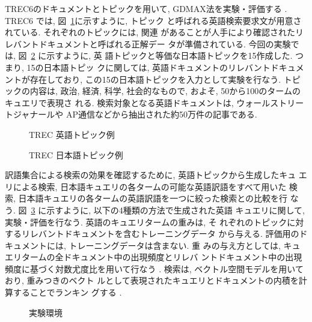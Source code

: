 TREC6のドキュメントとトピックを用いて, GDMAX法を実験・評価する
\cite{trec,trec4}. TREC6 では, 図~\ref{topic1e}に示すように, トピック
と呼ばれる英語検索要求文が用意されている. それぞれのトピックには, 関連
があることが人手により確認されたリレバントドキュメントと呼ばれる正解デー
タが準備されている. 今回の実験では, 図~\ref{topic1j} に示すように, 英
語トピックと等価な日本語トピックを15作成した. つまり, 15の日本語トピッ
クに関しては, 英語ドキュメントのリレバントドキュメントが存在しており, 
この15の日本語トピックを入力として実験を行なう. トピックの内容は, 政治, 
経済, 科学, 社会的なもので, およそ, 50から100のタームのキュエリで表現さ
れる. 検索対象となる英語ドキュメントは, ウォールストリートジャナールや
AP通信などから抽出された約50万件の記事である. 

\begin{figure}[tb]
\vspace*{-4mm}
      \begin{center}
      \end{center}
  \caption{TREC 英語トピック例}
  \label{topic1e}
\end{figure} 

\begin{figure}[tb]
      \begin{center}
      \end{center}
  \caption{TREC 日本語トピック例}
  \label{topic1j}
\end{figure} 

訳語集合による検索の効果を確認するために, 英語トピックから生成したキュ
エリによる検索, 日本語キュエリの各タームの可能な英語訳語をすべて用いた
検索, 日本語キュエリの各タームの英語訳語を一つに絞った検索との比較を行
なう. 図~\ref{expenv} に示すように, 以下の4種類の方法で生成された英語
キュエリに関して, 実験・評価を行なう. 英語のキュエリタームの重みは, そ
れぞれのトピックに対するリレバントドキュメントを含むトレーニングデータ
から与える. 評価用のドキュメントには, トレーニングデータは含まない. 重
みの与え方としては, キュエリタームの全ドキュメント中の出現頻度とリレバ
ントドキュメント中の出現頻度に基づく対数尤度比を用いて行なう
\cite{trec4}. 検索は, ベクトル空間モデルを用いており, 重みつきのベクト
ルとして表現されたキュエリとドキュメントの内積を計算することでランキン
グする
\cite{trec}. 

\begin{figure}[tb]
      \begin{center}
      \end{center}
  \caption{実験環境}
  \label{expenv}
\end{figure}

